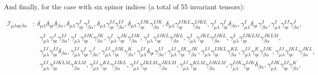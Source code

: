 \documentclass[11pt]{article}
\begin{document}
And finally, for the case with six spinor indices (a total of 55 invariant tensors):
\begin{small}
\begin{equation}
\begin{split}
    \mathcal{I}_{\mu \lambda \eta \epsilon \beta\alpha}&: \, \delta _{\mu \lambda }\delta _{\eta \epsilon }\delta _{\beta \alpha }, \delta _{\mu \lambda }\gamma _{\eta \epsilon }^{I}\gamma _{\beta \alpha }^{I}, \delta _{\mu \lambda }\gamma _{\eta \epsilon }^{IJ}\gamma _{\beta \alpha }^{IJ}, \delta _{\mu \lambda }\gamma _{\eta \epsilon }^{IJK}\gamma _{\beta \alpha }^{IJK}, \delta _{\mu \lambda }\gamma _{\eta \epsilon }^{IJKL}\gamma _{\beta \alpha }^{IJKL}, \gamma _{\mu \lambda }^{I}\gamma _{\eta \epsilon }^{I}\delta _{\beta \alpha }, \gamma _{\mu \lambda }^{I}\delta _{\eta \epsilon }\gamma _{\beta \alpha }^{I}, \gamma _{\mu \lambda }^{I}\gamma _{\eta \epsilon }^{IJ}\gamma _{\beta \alpha }^{J},\\
    &\quad \gamma _{\mu \lambda }^{I}\gamma _{\eta \epsilon }^{J}\gamma _{\beta \alpha }^{IJ}, \gamma _{\mu \lambda }^{I}\gamma _{\eta \epsilon }^{IJK}\gamma _{\beta \alpha }^{JK}, \gamma _{\mu \lambda }^{I}\gamma _{\eta \epsilon }^{JK}\gamma _{\beta \alpha }^{IJK}, \gamma _{\mu \lambda }^{I}\gamma _{\eta \epsilon }^{IJKL}\gamma _{\beta \alpha }^{JKL}, \gamma _{\mu \lambda }^{I}\gamma _{\eta \epsilon }^{JKL}\gamma _{\beta \alpha }^{IJKL}, \gamma _{\mu \lambda }^{I}\gamma _{\eta \epsilon }^{IJKLM}\gamma _{\beta \alpha }^{JKLM},\\
    &\quad \gamma _{\mu \lambda }^{IJ}\gamma _{\eta \epsilon }^{IJ}\delta _{\beta \alpha }, \gamma _{\mu \lambda }^{IJ}\gamma _{\eta \epsilon }^{I}\gamma _{\beta \alpha }^{J}, \gamma _{\mu \lambda }^{IJ}\gamma _{\eta \epsilon }^{IJK}\gamma _{\beta \alpha }^{K}, \gamma _{\mu \lambda }^{IJ}\delta _{\eta \epsilon }\gamma _{\beta \alpha }^{IJ}, \gamma _{\mu \lambda }^{IJ}\gamma _{\eta \epsilon }^{IK}\gamma _{\beta \alpha }^{JK}, \gamma _{\mu \lambda }^{IJ}\gamma _{\eta \epsilon }^{IJKL}\gamma _{\beta \alpha }^{KL}, \gamma _{\mu \lambda }^{IJ}\gamma _{\eta \epsilon }^{K}\gamma _{\beta \alpha }^{IJK}, \gamma _{\mu \lambda }^{IJ}\gamma _{\eta \epsilon }^{IKL}\gamma _{\beta \alpha }^{JKL},\\
    &\quad \gamma _{\mu \lambda }^{IJ}\gamma _{\eta \epsilon }^{IJKLM}\gamma _{\beta \alpha }^{KLM}, \gamma _{\mu \lambda }^{IJ}\gamma _{\eta \epsilon }^{KL}\gamma _{\beta \alpha }^{IJKL}, \gamma _{\mu \lambda }^{IJ}\gamma _{\eta \epsilon }^{IKLM}\gamma _{\beta \alpha }^{JKLM}, \gamma _{\mu \lambda }^{IJ}\gamma _{\eta \epsilon }^{KLM}\gamma _{\beta \alpha }^{IJKLM}, \gamma _{\mu \lambda }^{IJK}\gamma _{\eta \epsilon }^{IJK}\delta _{\beta \alpha }, \gamma _{\mu \lambda }^{IJK}\gamma _{\eta \epsilon }^{IJ}\gamma _{\beta \alpha }^{K},\\

\end{split}
\end{equation}
\end{small}
\end{document}
